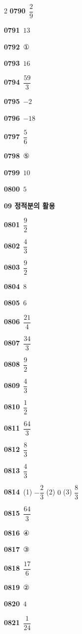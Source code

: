 \documentclass[10pt,a4paper]{article}
\begin{document}
\begin{multicols}{2}
\noindent\textbf{0790}\ $\dfrac{2}{9}$\par
\noindent\textbf{0791}\ $13$\par
\noindent\textbf{0792}\ ①\par
\noindent\textbf{0793}\ $16$\par
\noindent\textbf{0794}\ $\dfrac{59}{3}$\par
\noindent\textbf{0795}\ $-2$\par
\noindent\textbf{0796}\ $-18$\par
\noindent\textbf{0797}\ $\dfrac{5}{6}$\par
\noindent\textbf{0798}\ ⑤\par
\noindent\textbf{0799}\ $10$\par
\noindent\textbf{0800}\ $5$\par
\noindent\textbf{09 정적분의 활용}\par\smallskip
\noindent\textbf{0801}\ $\dfrac{9}{2}$\par
\noindent\textbf{0802}\ $\dfrac{4}{3}$\par
\noindent\textbf{0803}\ $\dfrac{9}{2}$\par
\noindent\textbf{0804}\ $8$\par
\noindent\textbf{0805}\ $6$\par
\noindent\textbf{0806}\ $\dfrac{21}{4}$\par
\noindent\textbf{0807}\ $\dfrac{34}{3}$\par
\noindent\textbf{0808}\ $\dfrac{9}{2}$\par
\noindent\textbf{0809}\ $\dfrac{4}{3}$\par
\noindent\textbf{0810}\ $\dfrac{1}{2}$\par
\noindent\textbf{0811}\ $\dfrac{64}{3}$\par
\noindent\textbf{0812}\ $\dfrac{8}{3}$\par
\noindent\textbf{0813}\ $\dfrac{4}{3}$\par
\noindent\textbf{0814}\ (1) $-\dfrac{2}{3}$ (2) $0$ (3) $\dfrac{8}{3}$\par
\noindent\textbf{0815}\ $\dfrac{64}{3}$\par
\noindent\textbf{0816}\ ④\par
\noindent\textbf{0817}\ ③\par
\noindent\textbf{0818}\ $\dfrac{17}{6}$\par
\noindent\textbf{0819}\ ②\par
\noindent\textbf{0820}\ $4$\par
\noindent\textbf{0821}\ $\dfrac{1}{24}$\par

\end{multicols}
\end{document}
